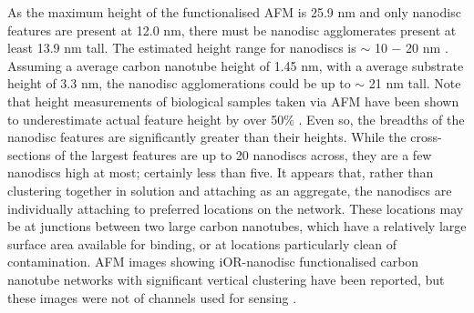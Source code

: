 \documentclass[
  a4paper,
]{scrbook}
\begin{document}
As the maximum height of the functionalised AFM is 25.9 nm and only
nanodisc features are present at 12.0 nm, there must be nanodisc
agglomerates present at least 13.9 nm tall. The estimated height range
for nanodiscs is \(\sim\) 10 \(-\) 20 nm
\autocite{Nath2007,Bayburt2010,Murugathas2020}. Assuming a average
carbon nanotube height of 1.45 nm, with a average substrate height of
3.3 nm, the nanodisc agglomerations could be up to \(\sim\) 21 nm tall.
Note that height measurements of biological samples taken via AFM have
been shown to underestimate actual feature height by over 50\%
\autocite{Vobornik2023}. Even so, the breadths of the nanodisc features
are significantly greater than their heights. While the cross-sections
of the largest features are up to 20 nanodiscs across, they are a few
nanodiscs high at most; certainly less than five. It appears that,
rather than clustering together in solution and attaching as an
aggregate, the nanodiscs are individually attaching to preferred
locations on the network. These locations may be at junctions between
two large carbon nanotubes, which have a relatively large surface area
available for binding, or at locations particularly clean of
contamination. AFM images showing iOR-nanodisc functionalised carbon
nanotube networks with significant vertical clustering have been
reported, but these images were not of channels used for sensing
\autocite{Murugathas2019b}.
\end{document}
